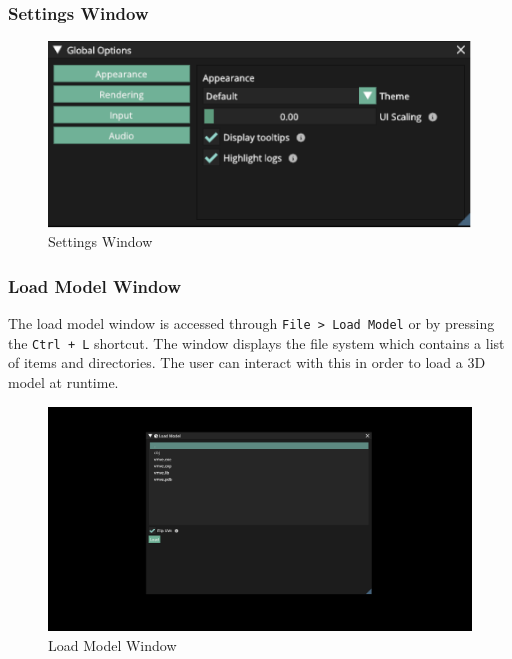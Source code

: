 \documentclass[11pt]{article}
\begin{document}
\subsubsection{Settings Window}

\begin{figure}[H]
  \centering
  \includegraphics[width=\textwidth]{images/settings_window.png}
  \caption{Settings Window}
  \label{fig:settings_window}
\end{figure}

\subsubsection{Load Model Window} \label{load_model}

The load model window is accessed through \lstinline{File > Load Model} or by
pressing the \lstinline{Ctrl + L} shortcut. The window displays the file system
which contains a list of items and directories. The user can interact with this
in order to load a 3D model at runtime.
\begin{figure}[H]
  \centering
  \includegraphics[width=\textwidth]{images/load_model_window.png}
  \caption{Load Model Window}
  \label{fig:load_model_window}
\end{figure}
\end{document}
